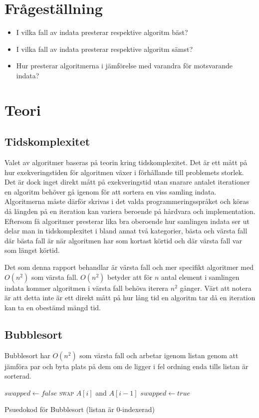 \documentclass[a4paper]{article}
\begin{document}
\section{Frågeställning}
\begin{itemize}
	\item I vilka fall av indata presterar respektive algoritm bäst?
	\item I vilka fall av indata presterar respektive algoritm sämst?
	\item Hur presterar algoritmerna i jämförelse med varandra för motsvarande indata?
\end{itemize}

\section{Teori}
\subsection{Tidskomplexitet}
Valet av algoritmer baseras på teorin kring tidskomplexitet. Det är ett mått på hur exekveringstiden för algoritmen växer i förhållande till problemets storlek. Det är dock inget direkt mått på exekveringstid utan snarare antalet iterationer en algoritm behöver gå igenom för att sortera en viss samling indata. Algoritmerna måste därför skrivas i det valda programmeringsspråket och köras då längden på en iteration kan variera beroende på hårdvara och implementation. Eftersom få algoritmer presterar lika bra oberoende hur samlingen indata ser ut delar man in tidskomplexitet i bland annat två kategorier, bästa och värsta fall där bästa fall är när algoritmen har som kortast körtid och där värsta fall var som längst körtid.

Det som denna rapport behandlar är värsta fall och mer specifikt algoritmer med $O(n^2)$ som värsta fall. $O(n^2)$ betyder att för $n$ antal element i samlingen indata kommer algoritmen i värsta fall behöva iterera $n^2$ gånger. Värt att notera är att detta inte är ett direkt mått på hur lång tid en algoritm tar då en iteration kan ta en obestämd mängd tid. 

\subsection{Bubblesort}
Bubblesort har $O(n^2)$ som värsta fall och arbetar igenom listan genom att jämföra par och byta plats på dem om de ligger i fel ordning enda tills listan är sorterad.\cite{bubble}
\begin{algorithm}
\begin{algorithmic}
	\State $swapped \gets false$
			\State \textsc{swap} $A[i]$ and $A[i-1]$
			\State $swapped \gets true$
		\EndIf
	\EndFor
\EndWhile
\EndFunction
\end{algorithmic}
\caption{Psuedokod för Bubblesort (listan är 0-indexerad)}
\end{algorithm}
\end{document}
